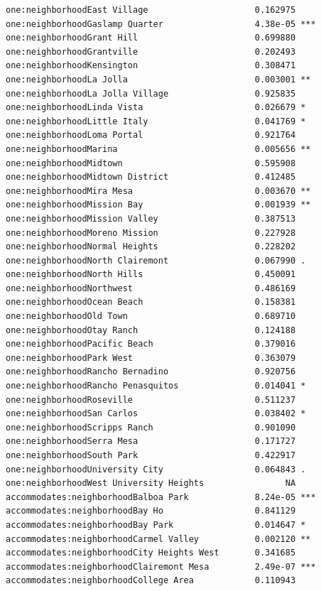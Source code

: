 \documentclass[
  letterpaper,
  DIV=11,
  numbers=noendperiod,
  oneside]{scrreprt}
\begin{document}
\begin{verbatim}
one:neighborhoodEast Village                     0.162975    
one:neighborhoodGaslamp Quarter                  4.38e-05 ***
one:neighborhoodGrant Hill                       0.699880    
one:neighborhoodGrantville                       0.202493    
one:neighborhoodKensington                       0.308471    
one:neighborhoodLa Jolla                         0.003001 ** 
one:neighborhoodLa Jolla Village                 0.925835    
one:neighborhoodLinda Vista                      0.026679 *  
one:neighborhoodLittle Italy                     0.041769 *  
one:neighborhoodLoma Portal                      0.921764    
one:neighborhoodMarina                           0.005656 ** 
one:neighborhoodMidtown                          0.595908    
one:neighborhoodMidtown District                 0.412485    
one:neighborhoodMira Mesa                        0.003670 ** 
one:neighborhoodMission Bay                      0.001939 ** 
one:neighborhoodMission Valley                   0.387513    
one:neighborhoodMoreno Mission                   0.227928    
one:neighborhoodNormal Heights                   0.228202    
one:neighborhoodNorth Clairemont                 0.067990 .  
one:neighborhoodNorth Hills                      0.450091    
one:neighborhoodNorthwest                        0.486169    
one:neighborhoodOcean Beach                      0.158381    
one:neighborhoodOld Town                         0.689710    
one:neighborhoodOtay Ranch                       0.124188    
one:neighborhoodPacific Beach                    0.379016    
one:neighborhoodPark West                        0.363079    
one:neighborhoodRancho Bernadino                 0.920756    
one:neighborhoodRancho Penasquitos               0.014041 *  
one:neighborhoodRoseville                        0.511237    
one:neighborhoodSan Carlos                       0.038402 *  
one:neighborhoodScripps Ranch                    0.901090    
one:neighborhoodSerra Mesa                       0.171727    
one:neighborhoodSouth Park                       0.422917    
one:neighborhoodUniversity City                  0.064843 .  
one:neighborhoodWest University Heights                NA    
accommodates:neighborhoodBalboa Park             8.24e-05 ***
accommodates:neighborhoodBay Ho                  0.841129    
accommodates:neighborhoodBay Park                0.014647 *  
accommodates:neighborhoodCarmel Valley           0.002120 ** 
accommodates:neighborhoodCity Heights West       0.341685    
accommodates:neighborhoodClairemont Mesa         2.49e-07 ***
accommodates:neighborhoodCollege Area            0.110943    

\end{verbatim}
\end{document}
